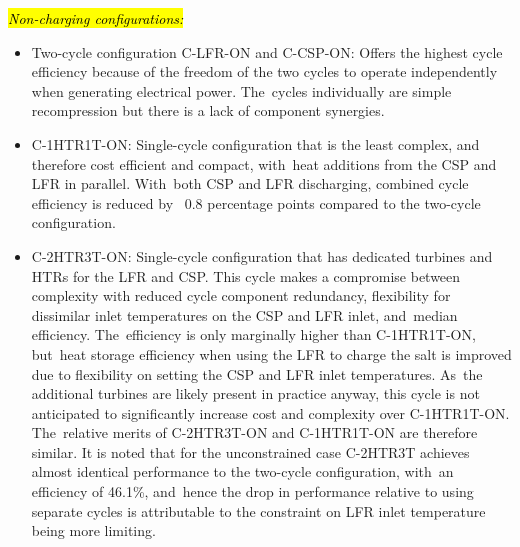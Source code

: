 \documentclass[sustainability,article,accept,moreauthors,pdftex]{Definitions/mdpi}
\begin{document}
\begin{paracol}{2}
\textit{\hl{Non-charging configurations:}}%
\begin{itemize}
    \item	Two-cycle configuration C-LFR-ON and C-CSP-ON: Offers the highest cycle efficiency because of the freedom of the two cycles to operate independently when generating electrical power. The~cycles individually are simple recompression but there is a lack of component synergies.
    \item	C-1HTR1T-ON: Single-cycle configuration that is the least complex, and therefore cost efficient and compact, with~heat additions from the CSP and LFR in parallel. With~both CSP and LFR discharging, combined cycle efficiency is reduced by ~0.8 percentage points compared to the two-cycle configuration. 
    \item   C-2HTR3T-ON: Single-cycle configuration that has dedicated turbines and HTRs for the LFR and CSP. This cycle makes a compromise between complexity with reduced cycle component redundancy, flexibility for dissimilar inlet temperatures on the CSP and LFR inlet, and~median efficiency. The~efficiency is only marginally higher than C-1HTR1T-ON, but~heat storage efficiency when using the LFR to charge the salt is improved due to flexibility on setting the CSP and LFR inlet temperatures. As~the additional turbines are likely present in practice anyway, this cycle is not anticipated to significantly increase cost and complexity over C-1HTR1T-ON. The~relative merits of C-2HTR3T-ON and C-1HTR1T-ON are therefore similar. It is noted that for the unconstrained case C-2HTR3T achieves almost identical performance to the two-cycle configuration, with~an efficiency of 46.1\%, and~hence the drop in performance relative to using separate cycles is attributable to the constraint on LFR inlet temperature being more limiting.
\end{itemize}


\end{paracol}
\end{document}

